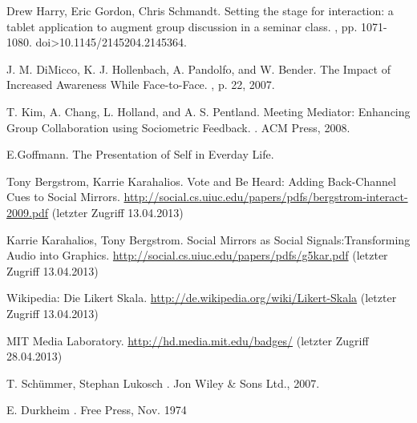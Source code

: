\documentclass{seminarvorlage}
\begin{document}
\begin{thebibliography}{[9]}

Drew Harry, Eric Gordon, Chris Schmandt.
\newblock Setting the stage for interaction: a tablet application to augment group discussion in a seminar class. 
, pp. 1071-1080. doi>10.1145/2145204.2145364. 

J. M. DiMicco, K. J. Hollenbach, A. Pandolfo, and W. Bender.
\newblock The Impact of Increased Awareness While Face-to-Face.
, p. 22, 2007.

T. Kim, A. Chang, L. Holland, and A. S. Pentland.
\newblock Meeting Mediator: Enhancing Group Collaboration using Sociometric Feedback. 
. ACM Press, 2008.

E.Goffmann.
\newblock The Presentation of Self in Everday Life.

Tony Bergstrom, Karrie Karahalios. 
\newblock Vote and Be Heard: Adding Back-Channel Cues to Social Mirrors.
 \url {http://social.cs.uiuc.edu/papers/pdfs/bergstrom-interact-2009.pdf} (letzter Zugriff 13.04.2013)

Karrie Karahalios, Tony Bergstrom. 
\newblock Social Mirrors as Social Signals:Transforming Audio into Graphics.
 \url {http://social.cs.uiuc.edu/papers/pdfs/g5kar.pdf} (letzter Zugriff 13.04.2013)

Wikipedia: Die Likert Skala.
\newblock \url {http://de.wikipedia.org/wiki/Likert-Skala} (letzter Zugriff 13.04.2013)

 MIT Media Laboratory. 
\newblock \url {http://hd.media.mit.edu/badges/} (letzter Zugriff 28.04.2013)

T. Schümmer, Stephan Lukosch
. Jon Wiley \& Sons Ltd., 2007.

E. Durkheim
. Free Press, Nov. 1974

\end{thebibliography}
\end{document}
